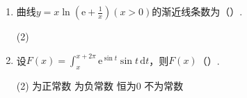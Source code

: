 \documentclass[../main.tex]{subfiles}
\begin{document}
\begin{enumerate}
          \begin{tasks}[label=\textbf{\Alph*.}, label-width=1.5em, column-sep=1em](1)
              \task 若$\lim_{x\to0}\frac{f(x)}{x}$存在，则$f(0)=0$
              \task 若$\lim_{x\to0}\frac{f(x)+f(-x)}{x}$存在，则$f(0)=0$
              \task 若$\lim_{x\to0}\frac{f(x)}{x}$存在，则$f'(0)$存在
              \task 若$\lim_{x\to0}\frac{f(x)-f(-x)}{x}$存在，则$f'(0)$存在
          \end{tasks}
          \vspace{1em}

    \item 曲线$y=x\ln\left(\mathrm{e}+\frac{1}{x}\right)(x>0)$的渐近线条数为（\qquad）.

          \begin{tasks}[label=\textbf{\Alph*.}, label-width=1.5em, column-sep=1em](2)
          \end{tasks}
          \vspace{1em}

    \item 设$F(x)=\int^{x+2\pi}_{x}\mathrm{e}^{\sin t}\sin t\,\mathrm{d}t$，则$F(x)$（\qquad）.

          \begin{tasks}[label=\textbf{\Alph*.}, label-width=1.5em, column-sep=1em](2)
              \task 为正常数
              \task 为负常数
              \task 恒为0
              \task 不为常数
          \end{tasks}
          \vspace{1em}
\end{enumerate}
\end{document}

